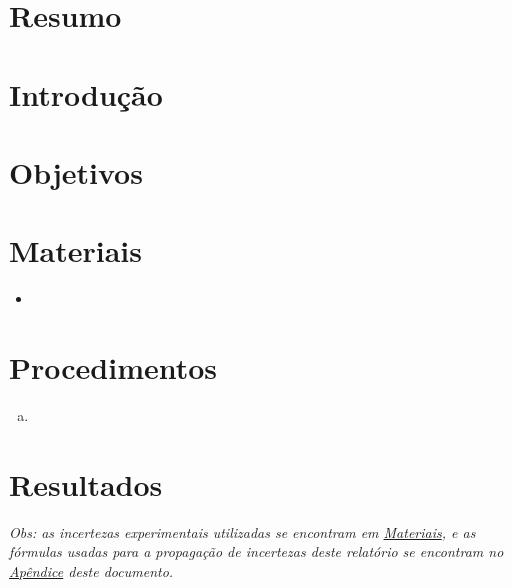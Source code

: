 \documentclass[a4paper, 12pt]{article}
\begin{document}
\newpage
\tableofcontents
\thispagestyle{empty}

\newpage
{}
\section{Resumo}


\newpage

\section{Introdução}


\newpage

\section{Objetivos}


\newpage

\section{Materiais}

\begin{itemize}
    \item 
\end{itemize}

\newpage

\section{Procedimentos}

\begin{enumerate}[a)]
    \item 
\end{enumerate}

\newpage

\section{Resultados}

\textit{Obs: as incertezas experimentais utilizadas se encontram em \hyperlink{INCERTEZAS}{Materiais}, e as fórmulas usadas para a propagação de incertezas deste relatório se encontram no \hyperlink{PROPAGAÇÃO}{Apêndice} deste documento.}
\end{document}
